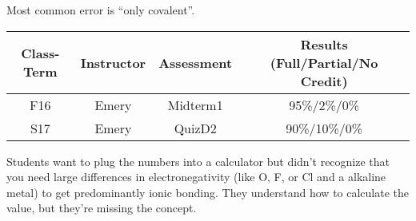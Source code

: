 \begin{outcomes}
Most common error is ``only covalent''.
	\begin{center}
		\begin{tabular}{cccc}
			\hline\hline
                Class-Term & Instructor & Assessment & Results (Full/Partial/No Credit) \\
		\hline
                F16 & Emery & Midterm1 & 95\%/2\%/0\%\\
                S17 & Emery & QuizD2 & 90\%/10\%/0\%\\
			\hline
		\end{tabular}
	\end{center}
\end{outcomes}

\begin{comments}

Students want to plug the numbers into a calculator but didn't recognize that you need large differences in electronegativity (like O, F, or Cl and a alkaline metal) to get predominantly ionic bonding. They understand how to calculate the value, but they're missing the concept.
	
\end{comments}

